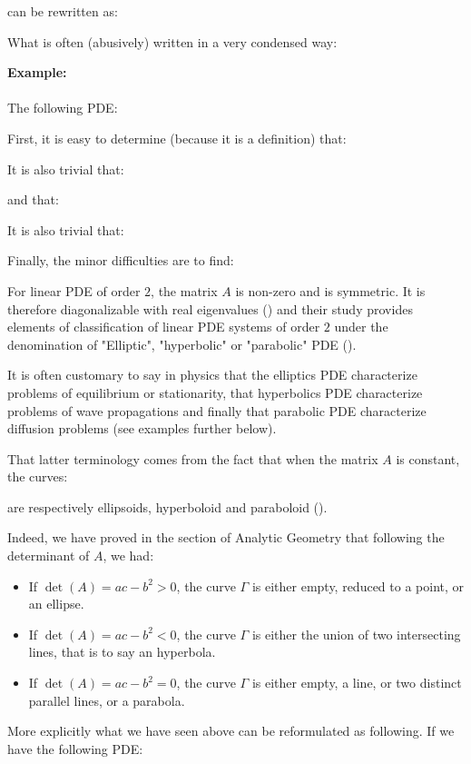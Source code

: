 	can be rewritten as:
	
	What is often (abusively) written in a very condensed way:
	
	\begin{tcolorbox}[colframe=black,colback=white,sharp corners]
	\textbf{{\Large {}}Example:}\\\\
	The following PDE:
	
	First, it is easy to determine (because it is a definition) that:
	
	It is also trivial that:
	
	and that:
	
	It is also trivial that:
	
	Finally, the minor difficulties are to find:
	
	\end{tcolorbox}
	For linear PDE of order $2$, the matrix $A$ is non-zero and is symmetric. It is therefore diagonalizable with real eigenvalues () and their study provides elements of classification of linear PDE systems of order $2$ under the denomination of "Elliptic", "hyperbolic" or "parabolic" PDE ().

	It is often customary to say in physics that the elliptics PDE characterize problems of equilibrium or stationarity, that hyperbolics PDE characterize problems of wave propagations and finally that parabolic PDE characterize diffusion problems (see examples further below).
	
	That latter terminology comes from the fact that when the matrix $A$ is constant, the curves:
	 
	are respectively ellipsoids, hyperboloid and paraboloid ().

	Indeed, we have proved in the section of Analytic Geometry that following the determinant of $A$, we had:
	\begin{itemize}
		\item If $\det(A)=ac-b^2>0$, the curve $\Gamma$ is either empty, reduced to a point, or an ellipse.

		\item If $\det(A)=ac-b^2<0$, the curve $\Gamma$ is either the union of two intersecting lines, that is to say an hyperbola.

		\item If $\det(A)=ac-b^2=0$, the curve $\Gamma$ is either empty, a line, or two distinct parallel lines, or a parabola.	
	\end{itemize}
	More explicitly what we have seen above can be reformulated as following. If we have the following PDE:
	
